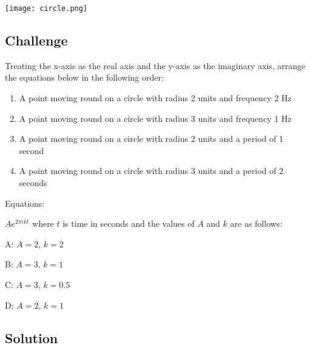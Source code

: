 \texttt{[image: circle.png]}

\subsection*{Challenge}
Treating the x-axis as the real axis and the y-axis as the imaginary axis, arrange the equations below in the following order:

\begin{enumerate}
    \item A point moving round on a circle with radius 2 units and frequency 2 Hz
    \item A point moving round on a circle with radius 3 units and frequency 1 Hz
    \item A point moving round on a circle with radius 2 units and a period of 1 second
    \item A point moving round on a circle with radius 3 units and a period of 2 seconds
\end{enumerate}

Equations:

$\displaystyle A e^{2 \pi i k t}$ where $t$ is time in seconds and the values of $A$ and $k$ are as follows:

A: $A=2$, $k=2$ 

B: $A=3$, $k=1$

C: $A=3$, $k=0.5$

D: $A=2$, $k=1$

\subsection*{Solution}




\iffalse

\fi


